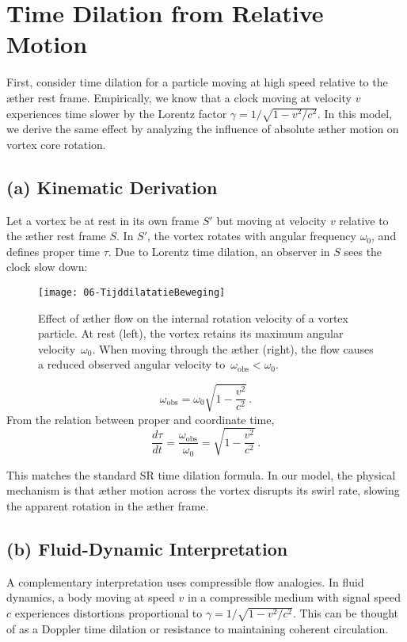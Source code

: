 
\section{Time Dilation from Relative Motion}

First, consider time dilation for a particle moving at high speed relative to the æther rest frame. Empirically, we know that a clock moving at velocity $v$ experiences time slower by the Lorentz factor $\gamma = 1/\sqrt{1 - v^2/c^2}$. In this model, we derive the same effect by analyzing the influence of absolute æther motion on vortex core rotation.

\subsection*{(a) Kinematic Derivation}

Let a vortex be at rest in its own frame $S'$ but moving at velocity $v$ relative to the æther rest frame $S$. In $S'$, the vortex rotates with angular frequency $\omega_0$, and defines proper time $\tau$. Due to Lorentz time dilation, an observer in $S$ sees the clock slow down:

\begin{figure}[htbp]
    \centering
    \texttt{[image: 06-TijddilatatieBeweging]}
    \caption{Effect of æther flow on the internal rotation velocity of a vortex particle. At rest (left), the vortex retains its maximum angular velocity~$\omega_0$. When moving through the æther (right), the flow causes a reduced observed angular velocity to~$\omega_{\mathrm{obs}} < \omega_0$.}
    \label{fig:TijddilatatieBeweging}
\end{figure}

\[
\omega_\text{obs} = \omega_0 \sqrt{1 - \frac{v^2}{c^2}} \,.
\]
From the relation between proper and coordinate time,
\[
\frac{d\tau}{dt} = \frac{\omega_\text{obs}}{\omega_0} = \sqrt{1 - \frac{v^2}{c^2}} \,. \tag{2}
\]

This matches the standard SR time dilation formula. In our model, the physical mechanism is that æther motion across the vortex disrupts its swirl rate, slowing the apparent rotation in the æther frame.

\subsection*{(b) Fluid-Dynamic Interpretation}

A complementary interpretation uses compressible flow analogies. In fluid dynamics, a body moving at speed $v$ in a compressible medium with signal speed $c$ experiences distortions proportional to $\gamma = 1/\sqrt{1 - v^2/c^2}$. This can be thought of as a Doppler time dilation or resistance to maintaining coherent circulation. 

